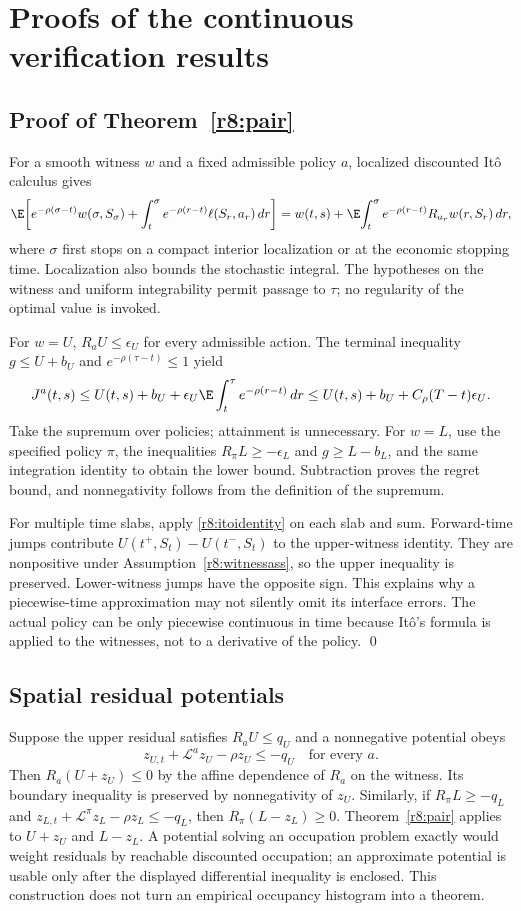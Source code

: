 \section{Proofs of the continuous verification results}\label{r8:proof:verification}
\subsection{Proof of Theorem~\ref{r8:pair}}
For a smooth witness $w$ and a fixed admissible policy $a$, localized discounted It\^o calculus gives
\begin{align}
 \E\!\left[e^{-\rho(\sigma-t)}w(\sigma,S_\sigma)
       +\int_t^\sigma e^{-\rho(r-t)}\ell(S_r,a_r)\,dr\right]
 =w(t,s)+\E\!\int_t^\sigma e^{-\rho(r-t)}R_{a_r}w(r,S_r)\,dr,\label{r8:itoidentity}
\end{align}
where $\sigma$ first stops on a compact interior localization or at the economic stopping time. Localization also bounds the stochastic integral. The hypotheses on the witness and uniform integrability permit passage to $\tau$; no regularity of the optimal value is invoked.

For $w=U$, $R_aU\leq\epsilon_U$ for every admissible action. The terminal inequality $g\leq U+b_U$ and $e^{-\rho(\tau-t)}\leq1$ yield
\[
 J^a(t,s)\leq U(t,s)+b_U+\epsilon_U\E\int_t^\tau e^{-\rho(r-t)}\,dr
 \leq U(t,s)+b_U+C_\rho(T-t)\epsilon_U.
\]
Take the supremum over policies; attainment is unnecessary. For $w=L$, use the specified policy $\pi$, the inequalities $R_\pi L\geq-\epsilon_L$ and $g\geq L-b_L$, and the same integration identity to obtain the lower bound. Subtraction proves the regret bound, and nonnegativity follows from the definition of the supremum.

For multiple time slabs, apply \eqref{r8:itoidentity} on each slab and sum. Forward-time jumps contribute $U(t^+,S_t)-U(t^-,S_t)$ to the upper-witness identity. They are nonpositive under Assumption~\ref{r8:witnessass}, so the upper inequality is preserved. Lower-witness jumps have the opposite sign. This explains why a piecewise-time approximation may not silently omit its interface errors. The actual policy can be only piecewise continuous in time because It\^o's formula is applied to the witnesses, not to a derivative of the policy. \qed

\subsection{Spatial residual potentials}
Suppose the upper residual satisfies $R_aU\leq q_U$ and a nonnegative potential obeys
\[
 z_{U,t}+\mathcal L^az_U-\rho z_U\leq-q_U\quad\text{for every }a.
\]
Then $R_a(U+z_U)\leq0$ by the affine dependence of $R_a$ on the witness. Its boundary inequality is preserved by nonnegativity of $z_U$. Similarly, if $R_\pi L\geq-q_L$ and $z_{L,t}+\mathcal L^\pi z_L-\rho z_L\leq-q_L$, then $R_\pi(L-z_L)\geq0$. Theorem~\ref{r8:pair} applies to $U+z_U$ and $L-z_L$. A potential solving an occupation problem exactly would weight residuals by reachable discounted occupation; an approximate potential is usable only after the displayed differential inequality is enclosed. This construction does not turn an empirical occupancy histogram into a theorem.

